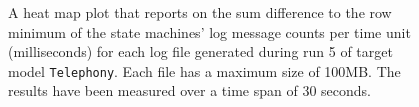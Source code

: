 \begin{figure}[htbp]
\centering
\begin{minipage}{1\textwidth}
  \centering
\end{minipage}
\caption{A heat map plot that reports on the sum difference to the row minimum of the state machines' log message counts per time unit (milliseconds) for each log file generated during run 5 of target model \texttt{Telephony}. Each file has a maximum size of 100MB. The results have been measured over a time span of 30 seconds.}
\label{figure:throughput_difference_random_det_telephony_5}
\end{figure}